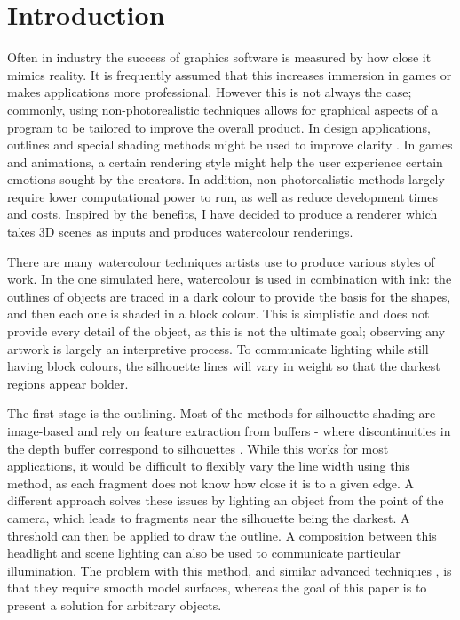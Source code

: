 \documentclass[a4paper,10pt]{article}
\begin{document}

\section{Introduction}

Often in industry the success of graphics software is measured by how close it mimics reality. It is frequently assumed that this increases immersion in games or makes applications more professional. However this is not always the case; commonly, using non-photorealistic techniques allows for graphical aspects of a program to be tailored to improve the overall product. In design applications, outlines and special shading methods might be used to improve clarity \cite{Gooch1998}. In games and animations, a certain rendering style might help the user experience certain emotions sought by the creators. In addition, non-photorealistic methods largely require lower computational power to run, as well as reduce development times and costs. Inspired by the benefits, I have decided to produce a renderer which takes 3D scenes as inputs and produces watercolour renderings.

There are many watercolour techniques artists use to produce various styles of work. In the one simulated here, watercolour is used in combination with ink: the outlines of objects are traced in a dark colour to provide the basis for the shapes, and then each one is shaded in a block colour. This is simplistic and does not provide every detail of the object, as this is not the ultimate goal; observing any artwork is largely an interpretive process. To communicate lighting while still having block colours, the silhouette lines will vary in weight so that the darkest regions appear bolder.

The first stage is the outlining. Most of the methods for silhouette shading are image-based and rely on feature extraction from buffers - where discontinuities in the depth buffer correspond to silhouettes \cite{Saito1990}. While this works for most applications, it would be difficult to flexibly vary the line width using this method, as each fragment does not know how close it is to a given edge. A different approach solves these issues by lighting an object from the point of the camera, which leads to fragments near the silhouette being the darkest. A threshold can then be applied to draw the outline. A composition between this headlight and scene lighting can also be used to communicate particular illumination. The problem with this method, and similar advanced techniques \cite{Goodwin2007}, is that they require smooth model surfaces, whereas the goal of this paper is to present a solution for arbitrary objects.
\end{document}
